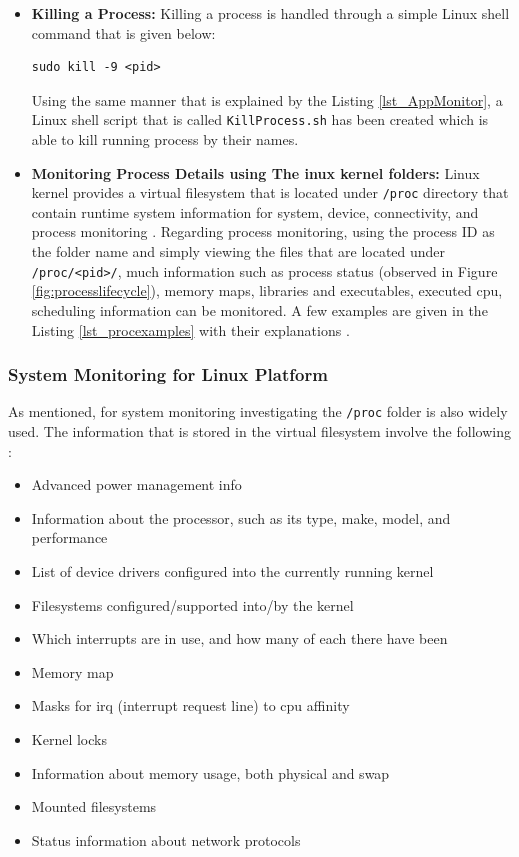 \begin{itemize}
	\item \textbf{Killing a Process:} Killing a process is handled through a simple Linux shell command that is given below:
	\begin{lstlisting}[style=bash]
		sudo kill -9 <pid>
	\end{lstlisting}
	Using the same manner that is explained by the Listing \ref{lst_AppMonitor}, a Linux shell script that is called \texttt{KillProcess.sh} has been created which is able to kill running process by their names.
	\item \textbf{Monitoring Process Details using The inux kernel folders:} Linux kernel provides a virtual filesystem that is located under \texttt{/proc} directory that contain runtime system information for system, device, connectivity, and process monitoring \cite{linuxproc}. Regarding process monitoring, using the process ID as the folder name and simply viewing the files that are located under \texttt{/proc/<pid>/}, much information such as process status (observed in Figure \ref{fig:processlifecycle}), memory maps, libraries and executables, executed cpu, scheduling information can be monitored. A few examples are given in the Listing \ref{lst_procexamples} with their explanations \cite{linuxproc}.
	
	
\end{itemize} 
\subsubsection{System Monitoring for Linux Platform}
As mentioned, for system monitoring investigating the \texttt{/proc} folder is also widely used. The information that is stored in the virtual filesystem involve the following \cite{linuxproc}:
\begin{itemize}
	\item Advanced power management info
	\item Information about the processor, such as its type, make, model, and performance
 	\item  List of device drivers configured into the currently running kernel
 	\item Filesystems configured/supported into/by the kernel
 	\item Which interrupts are in use, and how many of each there have been
 	\item Memory map
 	\item Masks for irq (interrupt request line) to cpu affinity
 	\item Kernel locks
 	\item Information about memory usage, both physical and swap
 	\item Mounted filesystems
 	\item Status information about network protocols
\end{itemize}

